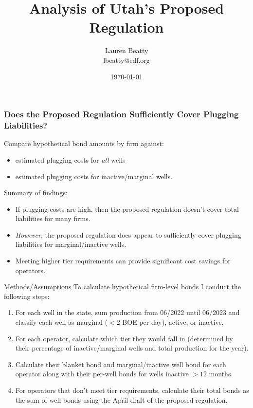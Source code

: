 \documentclass{beamer}
\title{Analysis of Utah's Proposed Regulation}
\author{Lauren Beatty\\ lbeatty@edf.org}
\institute{Environmental Defense Fund}
\date{\today}
\begin{document}
\frame{\titlepage}

\begin{frame}
\frametitle{Does the Proposed Regulation Sufficiently Cover Plugging Liabilities?}
    Compare hypothetical bond amounts by firm against:
    \begin{itemize}
        \item estimated plugging costs for \textit{all} wells
        \item estimated plugging costs for inactive/marginal wells.
    \end{itemize}
    Summary of findings:
    \begin{itemize}
        \item If plugging costs are high, then the proposed regulation doesn't cover total liabilities for many firms.
        \item \textit{However}, the proposed regulation does appear to sufficiently cover plugging liabilities for marginal/inactive wells.
        \item Meeting higher tier requirements can provide significant cost savings for operators.
    \end{itemize}
\end{frame}

\begin{frame}{Methods/Assumptions}
\label{BondCalc}
To calculate hypothetical firm-level bonds I conduct the following steps:
\begin{enumerate}
    \item For each well in the state, sum production from 06/2022 until 06/2023 and classify each well as marginal ($<$2 BOE per day), active, or inactive.
    \item For each operator, calculate which tier they would fall in (determined by their percentage of inactive/marginal wells and total production for the year).
    \item Calculate their blanket bond and marginal/inactive well bond for each operator along with their per-well bonds for wells inactive $>12$ months.
    \item For operators that don't meet tier requirements, calculate their total bonds as the sum of well bonds using the April draft of the proposed regulation.
\end{enumerate}
\hyperlink{bondingnumbers}{}
\end{frame}
\end{document}

